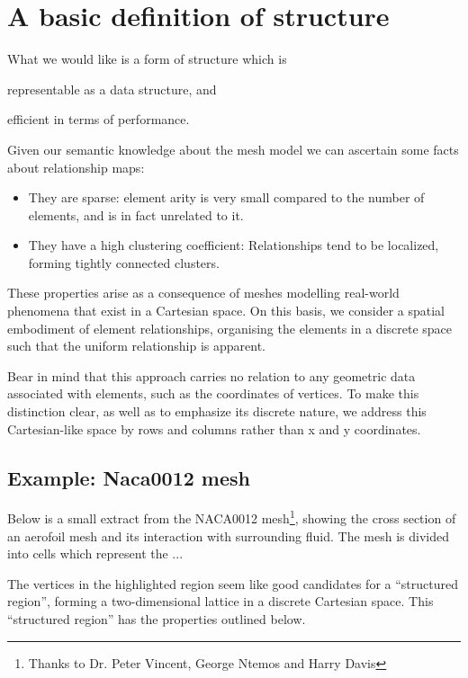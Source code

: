 
\section{A basic definition of structure}
What we would like is a form of structure which is
\begin{enumerate*}[label=\alph*)]
\item representable as a data structure, and \item efficient in terms of performance.
\end{enumerate*}

Given our semantic knowledge about the mesh model we can ascertain some facts about relationship maps:
\begin{itemize}
\item They are sparse: element arity is very small compared to the number of elements, and is in fact unrelated to it.
\item They have a high clustering coefficient: Relationships tend to be localized, forming tightly connected clusters.
\end{itemize}

These properties arise as a consequence of meshes modelling real-world phenomena that exist in a Cartesian space.
On this basis, we consider a spatial embodiment of element relationships, organising the elements in a discrete space such that the uniform relationship is apparent.

Bear in mind that this approach carries no relation to any geometric data associated with elements, such as the coordinates of vertices. To make this distinction clear, as well as to emphasize its discrete nature, we address this Cartesian-like space by rows and columns rather than x and y coordinates.

\subsection{Example: Naca0012 mesh}
Below is a small extract from the NACA0012 mesh\footnote{Thanks to Dr. Peter Vincent, George Ntemos and Harry Davis}, showing the cross section of an aerofoil mesh and its interaction with surrounding fluid. The mesh is divided into cells which represent the ...

\newcommand{\drawnaca}[2]{
	
}
\drawnaca{images/defining-structure/}{naca0012-plain}

The vertices in the highlighted region seem like good candidates for a ``structured region'', forming a two-dimensional lattice in a discrete Cartesian space. This ``structured region'' has the properties outlined below.


